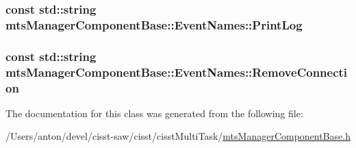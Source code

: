 \subsubsection[{Print\+Log}]{\setlength{\rightskip}{0pt plus 5cm}const std\+::string mts\+Manager\+Component\+Base\+::\+Event\+Names\+::\+Print\+Log\hspace{0.3cm}{\ttfamily [static]}}\label{classmts_manager_component_base_1_1_event_names_aba75227480c71f9c9f841514b8799534}
\hypertarget{classmts_manager_component_base_1_1_event_names_a6ed5a8983b5fcaf54f4325330c05d42e}{}
\subsubsection[{Remove\+Connection}]{\setlength{\rightskip}{0pt plus 5cm}const std\+::string mts\+Manager\+Component\+Base\+::\+Event\+Names\+::\+Remove\+Connection\hspace{0.3cm}{\ttfamily [static]}}\label{classmts_manager_component_base_1_1_event_names_a6ed5a8983b5fcaf54f4325330c05d42e}


The documentation for this class was generated from the following file\+:\begin{DoxyCompactItemize}
\item 
/\+Users/anton/devel/cisst-\/saw/cisst/cisst\+Multi\+Task/\hyperlink{mts_manager_component_base_8h}{mts\+Manager\+Component\+Base.\+h}\end{DoxyCompactItemize}
